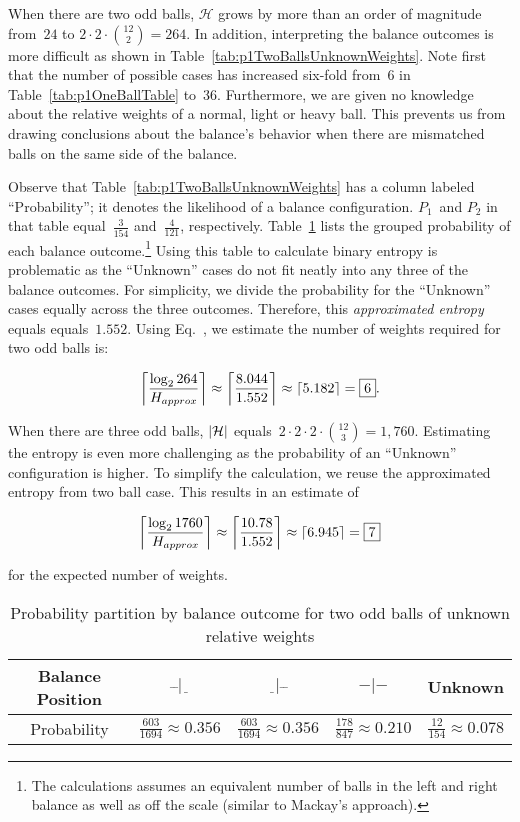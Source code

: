   When there are two odd balls, $\mathcal{H}$ grows by more than an order of magnitude from~$24$ to ${2\cdot2\cdot\binom{12}{2} = 264}$. In addition, interpreting the balance outcomes is more difficult as shown in Table~\ref{tab:p1TwoBallsUnknownWeights}.  Note first that the number of possible cases has increased six-fold from~6 in Table~\ref{tab:p1OneBallTable} to~36.  Furthermore, we are given no knowledge about the relative weights of a normal, light or heavy ball.  This prevents us from drawing conclusions about the balance's behavior when there are mismatched balls on the same side of the balance.

  

  Observe that Table~\ref{tab:p1TwoBallsUnknownWeights} has a column labeled ``Probability''; it denotes the likelihood of a balance configuration.  $P_{1}$~and $P_{2}$ in that table equal~$\frac{3}{154}$ and~$\frac{4}{121}$, respectively.  Table~\ref{tab:twoBallProbabilityBreakdown} lists the grouped probability of each balance outcome.\footnote{The calculations assumes an equivalent number of balls in the left and right balance as well as off the scale (similar to Mackay's approach).}  Using this table to calculate binary entropy is problematic as the ``Unknown'' cases do not fit neatly into any three of the balance outcomes.  For simplicity, we divide the probability for the ``Unknown'' cases equally across the three outcomes.  Therefore, this \textit{approximated entropy} equals equals~$1.552$.   Using Eq.~, we estimate the number of weights required for two odd balls is:

  \[ \ceil*{\frac{\log_{2} 264}{H_{approx}}} \approx \ceil*{\frac{8.044}{1.552}} \approx \ceil*{5.182} = \boxed{6} \text{.} \]

  When there are three odd balls, $\abs{\mathcal{H}}$ equals~${2\cdot2\cdot2\cdot\binom{12}{3} = 1,760}$.  Estimating the entropy is even more challenging as the probability of an ``Unknown'' configuration is higher.  To simplify the calculation, we reuse the approximated entropy from two ball case.  This results in an estimate of

  \[ \ceil*{\frac{\log_{2} 1760}{H_{approx}}} \approx \ceil*{\frac{10.78}{1.552}} \approx \ceil*{6.945} = \boxed{7}\]

  \noindent
  for the expected number of weights.

  \begin{table}
    \centering
    \caption{Probability partition by balance outcome for two odd balls of unknown relative weights}\label{tab:twoBallProbabilityBreakdown}
    \begin{tabular}{|c||c|c|c|c|}
      \hline
      Balance Position & $\bar{~}\bar{~}|\underline{~~}$  & $\underline{~~}|\bar{~}\bar{~}$  & $-|-$ & Unknown \\\hline
      Probability      & $\frac{603}{1694} \approx 0.356$ & $\frac{603}{1694} \approx 0.356$ & $\frac{178}{847} \approx 0.210$ & $\frac{12}{154} \approx 0.078$    \\\hline
    \end{tabular}
  \end{table}

